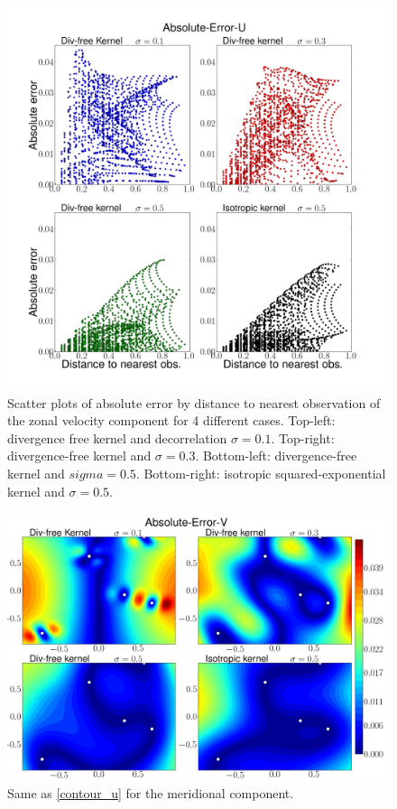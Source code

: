 \documentclass[12pt,a4paper]{article}%
\begin{document}
\begin{figure}
\noindent\includegraphics[width=36pc]{plots/Absolute-Error-U-scatter.png}
\caption{Scatter plots of absolute error by distance to nearest observation of 
the zonal velocity component for 4 different cases. Top-left: divergence free kernel and 
decorrelation $\sigma=0.1$. Top-right: divergence-free kernel and 
$\sigma=0.3$. Bottom-left: divergence-free kernel and $sigma=0.5$. Bottom-right: isotropic 
squared-exponential kernel and $\sigma=0.5$.}
\label{scatter_u}
\end{figure}


\begin{figure}
\noindent\includegraphics[width=36pc]{plots/Absolute-Error-V-contour.png}
\caption{Same as \ref{contour_u} for the meridional component.  }
\label{contour_v}
\end{figure}
\end{document}
